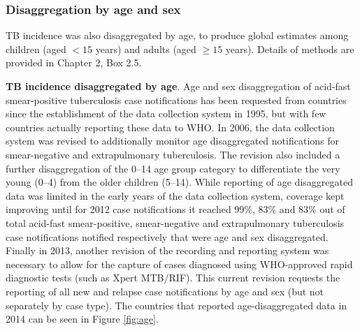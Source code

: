\subsubsection{Disaggregation by age and sex}

TB incidence was also disaggregated by age, to produce global estimates among children (aged $< 15$ years) and adults (aged $\geq 15$ years). Details of methods are provided in Chapter 2, Box 2.5.  

\textbf{TB incidence disaggregated by age}. Age and sex disaggregation of acid-fast smear-positive tuberculosis case notifications has been requested from countries since the establishment of the data collection system in 1995, but with few countries actually reporting these data to WHO. In 2006, the data collection system was revised to additionally monitor age disaggregated notifications for smear-negative and extrapulmonary tuberculosis. The revision also included a further disaggregation of the 0–14 age group category to differentiate the very young (0–4) from the older children (5–14). While reporting of age disaggregated data was limited in the early years of the data collection system, coverage kept improving until for 2012 case notifications it reached 99\%, 83\% and 83\% out of total acid-fast smear-positive, smear-negative and extrapulmonary tuberculosis case notifications notified respectively that were age and sex disaggregated. Finally in 2013, another revision of the recording and reporting system was necessary to allow for the capture of cases diagnosed using WHO-approved rapid diagnostic tests (such as Xpert MTB/RIF)\cite{Who2013-td}. This current revision requests the reporting of all new and relapse case notifications by age and sex (but not separately by case type). The countries that reported age-disaggregated data in 2014 can be seen in Figure \ref{fig:age}.


